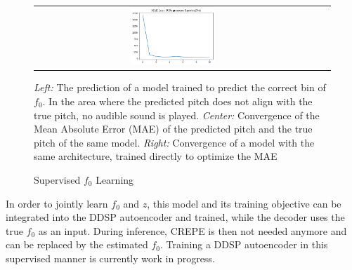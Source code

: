 \begin{theappendices}
\begin{figure}
\begin{tabular}{ccc}
        \includegraphics[width=0.31\textwidth]{figures/pitch_learning/supervised/f0_regression_convergence.png} \\
    \end{tabular}
    \caption{Supervised $f_0$ Learning}
    \label{fig:supervised-f0-results}
    \small{\textit{Left:} The prediction of a model trained to predict the correct bin of $f_0$. In the area where the predicted pitch does not align with the true pitch, no audible sound is played. \textit{Center:} Convergence of the Mean Absolute Error (MAE) of the predicted pitch and the true pitch of the same model. \textit{Right:} Convergence of a model with the same architecture, trained directly to optimize the MAE}
\end{figure}

In order to jointly learn $f_0$ and $z$, this model and its training objective can be integrated into the DDSP autoencoder and trained, while the decoder uses the true $f_0$ as an input. During inference, CREPE is then not needed anymore and can be replaced by the estimated $f_0$. Training a DDSP autoencoder in this supervised manner is currently work in progress.





\end{theappendices}
